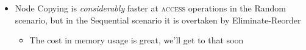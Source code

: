 \documentclass{beamer}
\begin{document}
\begin{frame}
\begin{columns}[t]
  \begin{column}{0.50\textwidth}
    \begin{itemize}

      \item Node Copying is \textit{considerably} faster at \textsc{access}
      operations in the Random scenario, but in the Sequential scenario it is
      overtaken by Eliminate-Reorder

      \begin{itemize}
        \item The cost in memory usage is great, we'll get to that soon
      \end{itemize}

    \end{itemize}
  \end{column}
\end{columns}
\end{frame}
\end{document}
